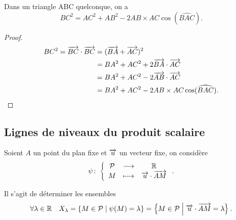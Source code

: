 \begin{prop}
  Dans un triangle ABC quelconque, on a \begin{equation}
    BC^2 = AC^2 + AB^2 - 2 AB \times AC \cos(\widehat{BAC}).
  \end{equation}
\end{prop}

\begin{proof}
  \begin{align*}
    BC^2 = \overrightarrow{BC} \cdot \overrightarrow{BC}& =(\overrightarrow{BA} + \overrightarrow{AC})^2 \\
                                    & = BA^2 + AC^2 +2 \overrightarrow{BA} \cdot 
                                    \overrightarrow{AC}\\
                                    & = BA^2 + AC^2 -2 \overrightarrow{AB} \cdot 
    \overrightarrow{AC}\\ & = BA^2 + AC^2 -2 AB \times AC \cos(\widehat{BAC}).
  \end{align*}
\end{proof}

\subsection{Lignes de niveaux du produit scalaire}
Soient \(A\) un point du plan fixe et \(\overrightarrow{u}\) un vecteur fixe, on considère
\begin{equation}
  \psi\colon \left\{\begin{array}{ccc} \mathcal{P} & \longrightarrow &\mathbb{R}\\ M & \longmapsto & \overrightarrow{u}\cdot\overrightarrow{AM} \end{array} \right..
\end{equation}

Il s'agit de déterminer les ensembles
\begin{equation}
  \forall \lambda \in \mathbb{R} \quad  X_\lambda = \left\{M \in \mathcal{P}\mathrel{}\middle|\mathrel{}\psi(M) = \lambda\right\} 
  = \left\{M \in \mathcal{P}\mathrel{}\middle|\mathrel{}\overrightarrow{u} \cdot \overrightarrow{AM} = \lambda\right\}.
\end{equation}

